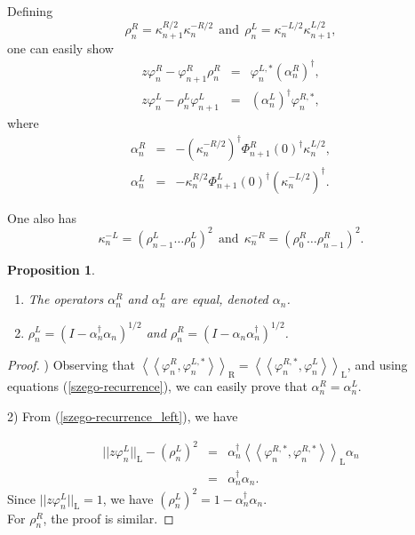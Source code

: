 \documentclass[11pt]{article}
\newtheorem{prop}{Proposition}[section]
\begin{document}
\noindent Defining 
$$
\rho_{n}^{R}=\kappa_{n+1}^{R/2}\kappa_{n}^{-R/2} ~~\mathrm{and}~~ \rho_{n}^{L}=\kappa_{n}^{-L/2}\kappa_{n+1}^{L/2},
$$
\noindent one can easily show 
\begin{eqnarray}\label{szego-recurrence}
z \varphi_{n}^{R} - \varphi_{n+1}^{R} \rho^{R}_{n}&=&  \varphi_{n}^{L,*}(\alpha_{n}^{R})^{\dag},  \label{szego-recurrence_right} \\
z \varphi_{n}^{L} - \rho^{L}_{n} \varphi_{n+1}^{L}&=&  (\alpha_{n}^{L})^{\dag} \varphi_{n}^{R,*}, \label{szego-recurrence_left}
\end{eqnarray} 
\noindent where 
\begin{eqnarray}
\alpha_{n}^{R} &=& -(\kappa^{-R/2}_{n})^{\dag} \Phi_{n+1}^{R}(0)^{\dag} \kappa^{L/2}_{n},  \label{eqn:alph_R}\\
\alpha_{n}^{L} &=& -\kappa^{R/2}_{n} \Phi_{n+1}^{L}(0)^{\dag} (\kappa^{-L/2}_{n})^{\dag}.
\end{eqnarray}

\noindent One also has 
$$
\kappa^{-L}_{n}=(\rho_{n-1}^{L} \dots \rho_{0}^{L})^{2}~~\mathrm{and}~~\kappa^{-R}_{n}=(\rho_{0}^{R} \dots \rho_{n-1}^{R})^{2}.
$$

\begin{prop}\label{prop4.2}
\hfill
\begin{enumerate}
    \item The operators $\alpha_{n}^{R}$ and $\alpha_{n}^{L}$ are equal, denoted $\alpha_n$.
    \item $\rho^{L}_{n} = (I - \alpha_{n}^{\dag}\alpha_{n})^{1/2}$ and $\rho^{R}_{n} = (I - \alpha_{n}\alpha_{n}^{\dag})^{1/2}$.
\end{enumerate}
\end{prop}

\begin{proof}
) Observing that $\left\langle \left\langle \varphi_{n}^{R},\varphi_{n}^{L,*}\right\rangle\right\rangle_{\mathrm{R}} = \left\langle \left\langle \varphi_{n}^{R,*},\varphi_{n}^{L} \right\rangle\right\rangle_{\mathrm{L}} $, and using equations (\ref{szego-recurrence}), we can easily prove that $\alpha_{n}^{R}=\alpha_{n}^{L}$.

2) From (\ref{szego-recurrence_left}), we have 

\begin{eqnarray*}
||z\varphi_{n}^{L}||_{\mathrm{L}}- (\rho^{L}_{n})^{2} &=& \alpha_{n}^{\dag} \left\langle \left\langle \varphi_{n}^{R,*},\varphi_{n}^{R,*} \right\rangle\right\rangle_{\mathrm{L}} \alpha_{n}\\
&=& \alpha_{n}^{\dag}\alpha_{n}.
\end{eqnarray*}
Since $||z\varphi_{n}^{L}||_{\mathrm{L}} =1$, we have  $(\rho^{L}_{n})^{2} = 1 - \alpha_{n}^{\dag}\alpha_{n}.$\\
For $\rho^{R}_{n}$, the proof is similar.
\end{proof}
\end{document}
